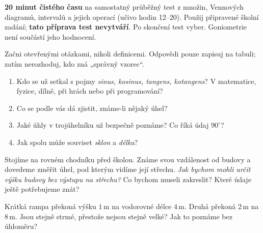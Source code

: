\documentclass[11pt,a4paper]{article}
\begin{document}
\begin{zadaniBox}[title={Poznámka pro učitele - Organizace testu}]
\textbf{20 minut čistého času} na samostatný průběžný test z množin,
Vennových diagramů, intervalů a jejich operací (učivo hodin 12--20).
Použij připravené školní zadání; \textbf{tato příprava test nevytváří}.
Po skončení test vyber. Goniometrie není součástí jeho hodnocení.
\end{zadaniBox}

Začni otevřenými otázkami, nikoli definicemi. Odpovědi pouze zapisuj na tabuli;
zatím nerozhoduj, kdo zná „správný vzorec“.
\begin{zadaniBox}[title={Samostatná práce 1}]
\begin{enumerate}[label=\arabic*)]
\item Kdo se už setkal s pojmy \emph{sinus, kosinus, tangens, kotangens}?
  V matematice, fyzice, dílně, při hrách nebo při programování?
\item Co se podle vás dá zjistit, známe-li nějaký úhel?
\item Jaké úhly v trojúhelníku už bezpečně poznáme? Co říká údaj $90^\circ$?
\item Jak spolu může souviset \emph{sklon} a \emph{délka}?
\end{enumerate}
\end{zadaniBox}

\begin{zadaniBox}[title={Samostatná práce 2}]
Stojíme na rovném chodníku před školou. Známe svou vzdálenost od budovy
a dovedeme změřit úhel, pod kterým vidíme její střechu.
\emph{Jak bychom mohli určit výšku budovy bez výstupu na střechu?}
Co bychom museli zakreslit? Které údaje ještě potřebujeme znát?
\end{zadaniBox}
\begin{zadaniBox}[title={Samostatná práce 3}]
Krátká rampa překoná výšku $1\,\mathrm m$ na vodorovné délce $4\,\mathrm m$.
Druhá překoná $2\,\mathrm m$ na $8\,\mathrm m$.
Jsou stejně strmé, přestože nejsou stejně velké? Jak to poznáme bez úhloměru?
\end{zadaniBox}
\end{document}
